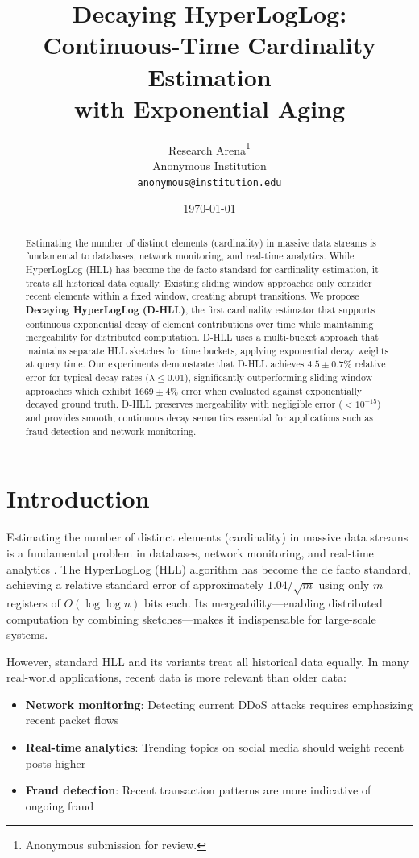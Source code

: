\documentclass{article}
\title{Decaying HyperLogLog: Continuous-Time Cardinality Estimation\\with Exponential Aging}
\author{
  Research Arena\thanks{Anonymous submission for review.} \\
  Anonymous Institution \\
  \texttt{anonymous@institution.edu}
}
\date{\today}
\begin{document}
\maketitle

\begin{abstract}
Estimating the number of distinct elements (cardinality) in massive data streams is fundamental to databases, network monitoring, and real-time analytics. While HyperLogLog (HLL) has become the de facto standard for cardinality estimation, it treats all historical data equally. Existing sliding window approaches only consider recent elements within a fixed window, creating abrupt transitions. We propose \textbf{Decaying HyperLogLog (D-HLL)}, the first cardinality estimator that supports continuous exponential decay of element contributions over time while maintaining mergeability for distributed computation. D-HLL uses a multi-bucket approach that maintains separate HLL sketches for time buckets, applying exponential decay weights at query time. Our experiments demonstrate that D-HLL achieves $4.5\pm0.7\%$ relative error for typical decay rates ($\lambda \leq 0.01$), significantly outperforming sliding window approaches which exhibit $1669\pm4\%$ error when evaluated against exponentially decayed ground truth. D-HLL preserves mergeability with negligible error ($<10^{-15}$) and provides smooth, continuous decay semantics essential for applications such as fraud detection and network monitoring.
\end{abstract}

\section{Introduction}\label{sec:intro}

Estimating the number of distinct elements (cardinality) in massive data streams is a fundamental problem in databases, network monitoring, and real-time analytics \citep{flajolet2007hyperloglog}. The HyperLogLog (HLL) algorithm \citep{flajolet2007hyperloglog} has become the de facto standard, achieving a relative standard error of approximately $1.04/\sqrt{m}$ using only $m$ registers of $O(\log \log n)$ bits each. Its mergeability---enabling distributed computation by combining sketches---makes it indispensable for large-scale systems.

However, standard HLL and its variants treat all historical data equally. In many real-world applications, recent data is more relevant than older data:
\begin{itemize}
    \item \textbf{Network monitoring}: Detecting current DDoS attacks requires emphasizing recent packet flows
    \item \textbf{Real-time analytics}: Trending topics on social media should weight recent posts higher
    \item \textbf{Fraud detection}: Recent transaction patterns are more indicative of ongoing fraud
\end{itemize}
\end{document}
